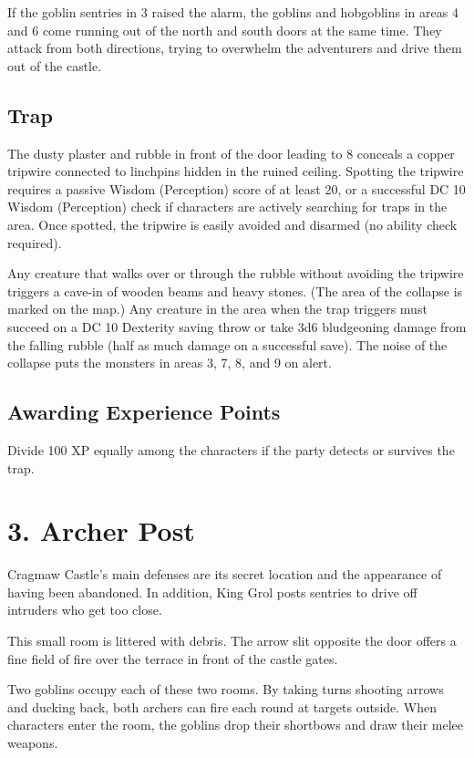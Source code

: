 \documentclass[10pt,a4paper,twoside,bg=print,twocolumn,openany,nodeprecatedcode]{dndbook}
\begin{document}
If the goblin sentries in 3 raised the alarm, the goblins and hobgoblins in areas 4 and 6 come running out of the north and south doors at the same time. They attack from both directions, trying to overwhelm the adventurers and drive them out of the castle.

\subsection{Trap}
The dusty plaster and rubble in front of the door leading to 8 conceals a copper tripwire connected to linchpins hidden in the ruined ceiling. Spotting the tripwire requires a passive Wisdom (Perception) score of at least 20, or a successful DC 10 Wisdom (Perception) check if characters are actively searching for traps in the area. Once spotted, the tripwire is easily avoided and disarmed (no ability check required).

Any creature that walks over or through the rubble without avoiding the tripwire triggers a cave-in of wooden beams and heavy stones. (The area of the collapse is marked on the map.) Any creature in the area when the trap triggers must succeed on a DC 10 Dexterity saving throw or take 3d6 bludgeoning damage from the falling rubble (half as much damage on a successful save). The noise of the collapse puts the monsters in areas 3, 7, 8, and 9 on alert.

\subsection{Awarding Experience Points}
Divide 100 XP equally among the characters if the party detects or survives the trap.

\section{3. Archer Post}
Cragmaw Castle's main defenses are its secret location and the appearance of having been abandoned. In addition, King Grol posts sentries to drive off intruders who get too close.

\begin{DndReadAloud}{}
This small room is littered with debris. The arrow slit opposite the door offers a fine field of fire over the terrace in front of the castle gates.

\end{DndReadAloud}

Two goblins occupy each of these two rooms. By taking turns shooting arrows and ducking back, both archers can fire each round at targets outside. When characters enter the room, the goblins drop their shortbows and draw their melee weapons.
\end{document}

